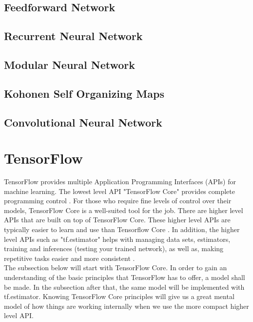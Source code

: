 \subsection{Feedforward Network}
\subsection{Recurrent Neural Network}
\subsection{Modular Neural Network}
\subsection{Kohonen Self Organizing Maps}
\subsection{Convolutional Neural Network}


\section{TensorFlow}
TensorFlow provides multiple Application Programming Interfaces (APIs) for machine learning. The lowest level API "TensorFlow Core" provides complete programming control \cite{tensorflow2015-whitepaper}. For those who require fine levels of control over their models, TensorFlow Core is a well-suited tool for the job. There are higher level APIs that are built on top of TensorFlow Core. These higher level APIs are typically easier to learn and use than Tensorflow Core \cite{tensorflow2015-whitepaper}. In addition, the higher level APIs such as "tf.estimator" helps with managing data sets, estimators, training and inferences (testing your trained network), as well as, making repetitive tasks easier and more consistent \cite{tensorflow2015-whitepaper}.\\

The subsection below will start with TensorFlow Core. In order to gain an understanding of the basic principles that TensorFlow has to offer, a model shall be made. In the subsection after that, the same model will be implemented with tf.estimator. Knowing TensorFlow Core principles will give us a great mental model of how things are working internally when we use the more compact higher level API.

